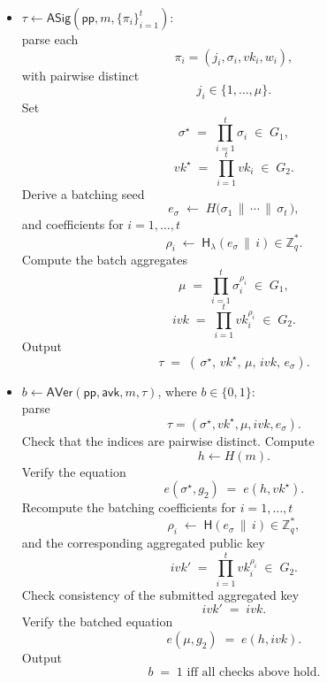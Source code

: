 \documentclass{article}
\begin{document}
\begin{itemize}
          \item $\tau \leftarrow \mathsf{ASig}(\mathsf{pp}, m, \{\pi_i\}_{i=1}^{t})$:\\
        parse each
        \[
          \pi_i=(j_i,\sigma_i,vk_i,w_i),
        \]
        with pairwise distinct
        \[
          j_i \in \{1,\dots,\mu\}.
        \]
        Set
        \[
          \sigma^\star \;=\; \prod_{i=1}^{t} \sigma_i \;\in\; G_1,
        \]
        \[
          vk^\star \;=\; \prod_{i=1}^{t} vk_i \;\in\; G_2.
        \]
        Derive a batching seed
        \[
          e_\sigma \;\leftarrow\; H\!\bigl(\sigma_1 \,\|\, \cdots \,\|\, \sigma_t \,\bigr),
        \]
        and coefficients for $i=1,\dots,t$
        \[
          \rho_i \;\leftarrow\; \mathsf{H_\lambda}(e_\sigma \,\|\, i) \in \mathbb{Z}_q^\ast.
        \]
        Compute the batch aggregates
        \[
          \mu \;=\; \prod_{i=1}^{t} \sigma_i^{\rho_i} \;\in\; G_1,
        \]
        \[
          ivk \;=\; \prod_{i=1}^{t} vk_i^{\rho_i} \;\in\; G_2.
        \]
        Output
        \[
          \tau \;=\; (\,\sigma^\star,\, vk^\star,\, \mu,\, ivk,\, e_\sigma).
        \]

  \item $b \leftarrow \mathsf{AVer}(\mathsf{pp}, \mathsf{avk}, m, \tau)$, where $b\in\{0,1\}$:\\
        parse
        \[
          \tau=(\sigma^\star, vk^\star, \mu, ivk, e_\sigma).
        \]
        Check that the indices are pairwise distinct.
        Compute
        \[
          h \leftarrow H(m).
        \]
        Verify the equation
        \[
          e(\sigma^\star, g_2) \;=\; e(h, vk^\star).
        \]
        Recompute the batching coefficients for $i=1,\dots,t$
        \[
          \rho_i \;\leftarrow\; \mathsf{H}(e_\sigma \,\|\, i) \in \mathbb{Z}_q^\ast,
        \]
        and the corresponding aggregated public key
        \[
          ivk' \;=\; \prod_{i=1}^{t} vk_i^{\rho_i} \;\in\; G_2.
        \]
        Check consistency of the submitted aggregated key
        \[
          ivk' \;=\; ivk.
        \]
        Verify the batched equation
        \[
          e(\mu, g_2) \;=\; e(h, ivk).
        \]
        Output
        \[
          b \;=\; 1 \text{ iff all checks above hold.}
        \]
\end{itemize}

\end{document}
